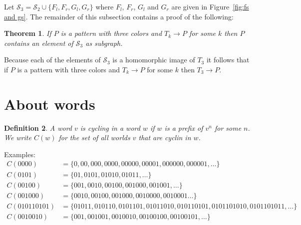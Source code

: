 \documentclass[a4paper]{article}
\newcommand{\subpatterns}{\mathcal{S}}
\newtheorem{theorem}{Theorem}[section]
\newtheorem{definition}[theorem]{Definition}
\begin{document}
Let $\subpatterns_3 = \subpatterns_2 \cup \{F_l,F_r,G_l,G_r\}$ where
$F_l$, $F_r$, $G_l$ and $G_r$ are given in Figure~\ref{fig:fs and gs}. The
remainder of this subsection contains a proof of the following:
\begin{theorem}
 If $P$ is a pattern with three colors and $T_k \to P$ for some $k$ then
$P$ contains an element of $\subpatterns_3$ as subgraph.
\end{theorem}
Because each of the elements of $\subpatterns_3$ is a homomorphic image
of $T_3$ it follows that if $P$ is a pattern with three colors and $T_k
\to P$ for some $k$ then $T_3 \to P$.


\section{About words}

\begin{definition}
 A word $v$ is \emph{cycling} in a word $w$ if $w$ is a prefix of $v^n$
for some $n$. We write $C(w)$ for the set of all worlds $v$ that are
cyclin in $w$.
\end{definition}

Examples:
\begin{align*}
 C(0000) & = \{0,00,000,0000,00000,00001,000000,000001,\dots\} \\
 C(0101) & = \{01,0101,01010,01011,\dots\} \\
 C(00100) & = \{001,0010,00100,001000,001001,\dots\} \\
 C(001000) & = \{0010,00100,001000,0010000,0010001\dots\} \\
 C(010110101) & =
\{01011,010110,0101101,01011010,010110101,0101101010,0101101011,\dots\}
\\
 C(0010010) & = \{001,001001,0010010,00100100,00100101,\dots\}
\end{align*}
\end{document}
